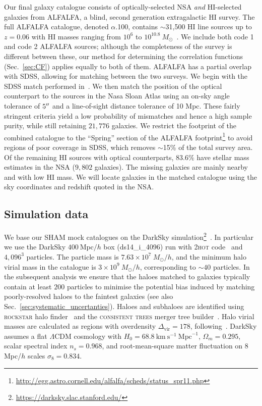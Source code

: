 \documentclass[usenatbib,useAMS]{mnras}
\newcommand{\HI}{\ensuremath{\mathrm{H}\scriptstyle\mathrm{I}}}
\begin{document}
Our final galaxy catalogue consists of optically-selected \ac{NSA} \emph{and} $\HI$-selected galaxies from ALFALFA, a blind, second generation extragalactic $\HI$ survey. The full ALFALFA catalogue, denoted $\alpha$.100, contains $\sim$31,500 $\HI$ line sources up to $z=0.06$ with $\HI$ masses ranging from $10^6$ to $10^{10.8}~M_\odot$~\citep{Haynes_2018}. We include both code 1 and code 2 ALFALFA sources; although the completeness of the survey is different between these, our method for determining the correlation functions (Sec.~\ref{sec:CF}) applies equally to both of them. ALFALFA has a partial overlap with \ac{SDSS}, allowing for matching between the two surveys. We begin with the SDSS match performed in~\citet{ALFALFA-SDSS}. We then match the position of the optical counterpart to the sources in the Nasa Sloan Atlas using an on-sky angle tolerance of $5\hbox{$^{\prime\prime}$}$ and a line-of-sight distance tolerance of 10 Mpc. These fairly stringent criteria yield a low probability of mismatches and hence a high sample purity, while still retaining $21,776$ galaxies. We restrict the footprint of the combined catalogue to the ``Spring'' section of the ALFALFA footprint\footnote{\url{http://egg.astro.cornell.edu/alfalfa/scheds/status\_spr11.php}} to avoid regions of poor coverage in SDSS, which removes $\sim$15\% of the total survey area. Of the remaining $\HI$ sources with optical counterparts, $83.6\%$ have stellar mass estimates in the NSA ($9,802$ galaxies). The missing galaxies are mainly nearby and with low $\HI$ mass. We will locate galaxies in the matched catalogue using the sky coordinates and redshift quoted in the NSA.


\subsection{Simulation data}\label{sec:data_sim}

We base our \ac{SHAM} mock catalogues on the DarkSky simulation\footnote{\url{https://darksky.slac.stanford.edu/}}~\citep{DarkSky}. In particular we use the DarkSky $400~\text{Mpc}/h$ box (ds14\_i\_4096) run with \textsc{2hot} code~\citep{2HOT} and $4,096^3$ particles. The particle mass is $7.63\times 10^7~M_\odot/h$, and the minimum halo virial mass in the catalogue is $3 \times 10^9~M_\odot/h$, corresponding to $\sim 40$ particles. In the subsequent analysis we ensure that the haloes matched to galaxies typically contain at least $200$ particles to minimise the potential bias induced by matching poorly-resolved haloes to the faintest galaxies (see also Sec.~\ref{sec:systematic_uncertanties}). Haloes and subhaloes are identified using \textsc{rockstar} halo finder~\citep{Behroozi_Rockstar} and the \textsc{consistent trees} merger tree builder~\citep{Behroozi_Consistent}. Halo virial masses are calculated as regions with overdensity $\Delta_{\text{vir}}=178$, following~\cite{Bryan_Norman}. DarkSky assumes a flat $\Lambda$CDM cosmology with $H_0 = 68.8~\mathrm{km}~ \mathrm{s}^{-1}~\mathrm{Mpc}^{-1}$, $\Omega_m = 0.295$, scalar spectral index $n_s = 0.968$, and root-mean-square matter fluctuation on 8 Mpc/$h$ scales $\sigma_8 = 0.834$.
\end{document}
